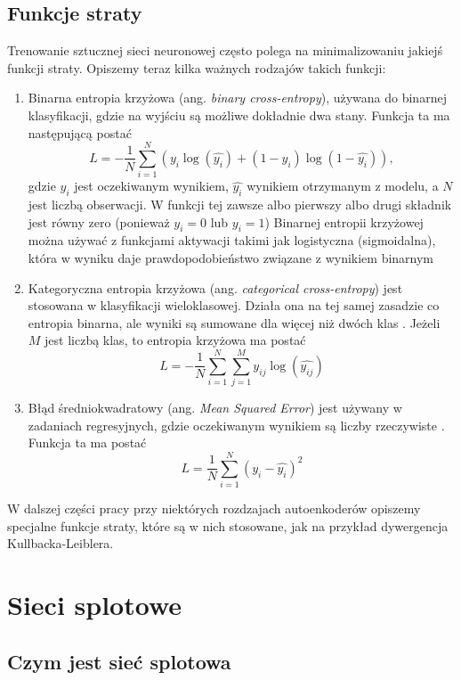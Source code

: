 \documentclass[12pt]{mwbk}
\theoremstyle{plain}
\theoremstyle{definition}
\theoremstyle{remark}
\begin{document}
\subsection{Funkcje straty}

Trenowanie sztucznej sieci neuronowej często polega na minimalizowaniu jakiejś funkcji straty. Opiszemy teraz kilka ważnych rodzajów takich funkcji:
\begin{enumerate}
	\item Binarna entropia krzyżowa (ang. \emph{binary cross-entropy}), używana do binarnej klasyfikacji, gdzie na wyjściu są możliwe dokładnie dwa stany\cite{programmathically}. Funkcja ta ma następującą postać
	$$L=-\frac{1}{N}\sum_{i=1}^N(y_i \log(\hat{y_i})+(1-y_i)\log(1-\hat{y_i})),$$
	gdzie $y_i$ jest oczekiwanym wynikiem,  $\hat{y_i}$ wynikiem otrzymanym z modelu, a $N$ jest liczbą obserwacji. W funkcji tej zawsze albo pierwszy albo drugi składnik jest równy zero (ponieważ $y_i=0$ lub $y_i=1$) Binarnej entropii krzyżowej można używać z funkcjami aktywacji takimi jak logistyczna (sigmoidalna), która w wyniku daje prawdopodobieństwo związane z wynikiem binarnym
	\item Kategoryczna entropia krzyżowa (ang. \emph{categorical cross-entropy}) jest stosowana w klasyfikacji wieloklasowej. Działa ona na tej samej zasadzie co entropia binarna, ale wyniki są sumowane dla więcej niż dwóch klas \cite{programmathically}. Jeżeli $M$ jest liczbą klas, to entropia krzyżowa ma postać
	$$L=-\frac{1}{N}\sum_{i=1}^N\sum_{j=1}^M y_{ij}\log(\hat{y_{ij}})$$
	\item Błąd średniokwadratowy (ang. \emph{Mean Squared Error}) jest używany w zadaniach regresyjnych, gdzie oczekiwanym wynikiem są liczby rzeczywiste \cite{programmathically}. Funkcja ta ma postać
	$$L=\frac{1}{N}\sum_{i=1}^N(y_i-\hat{y_i})^2$$
\end{enumerate}
W dalszej części pracy przy niektórych rozdzajach autoenkoderów opiszemy specjalne funkcje straty, które są w nich stosowane, jak na przykład dywergencja Kullbacka-Leiblera.


\section{Sieci splotowe}


\subsection{Czym jest sieć splotowa}
\end{document}
